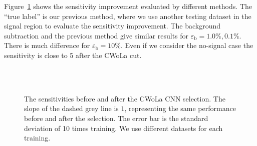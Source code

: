 \documentclass[12pt]{article}
\begin{document}
        Figure~\ref{fig:sensitivity_improvement_true_label_background_subtraction} shows the sensitivity improvement evaluated by different methods. The ``true label'' is our previous method, where we use another testing dataset in the signal region to evaluate the sensitivity improvement. The background subtraction and the previous method give similar results for $\varepsilon_{\text{b}} = 1.0 \%, 0.1 \%$. There is much difference for $\varepsilon_{\text{b}} = 10 \%$. Even if we consider the no-signal case the sensitivity is close to 5 after the CWoLa cut. 
        \begin{figure}[htpb]
            \centering
             \\
             \\
            \caption{The sensitivities before and after the CWoLa CNN selection. The slope of the dashed grey line is $1$, representing the same performance before and after the selection. The error bar is the standard deviation of 10 times training. We use different datasets for each training.}
            \label{fig:sensitivity_improvement_true_label_background_subtraction}
        \end{figure}
\end{document}
